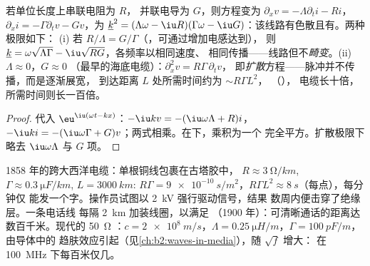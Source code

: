 \begin{proposition}\label{prop:b2:dispersion-wave-packets:lossy}
若单位长度上串联电阻为 $R$，
并联电导为 $G$，则方程变为 $\partial_xv = -\Lambda\partial_ti - Ri$，$\partial_xi =
-\Gamma\partial_tv - Gv$，为 $\underline k^2 = (\Lambda\omega -
\iu R)(\Gamma\omega - \iu G)$：该线路有色散且有。两种极限如下：
(i) 若 $R/\Lambda = G/\Gamma$（，可通过增加电感达到），
则 $\underline k = \omega\sqrt{\Lambda\Gamma} - \iu\sqrt{RG}$，各频率以相同速度、
相同传播——线路\emph{}但不\emph{畸变}。(ii) $\Lambda \approx 0$，$G \approx 0$
（最早的海底电缆）：$\partial_x^2v = R\Gamma\,\partial_tv$，
即\emph{扩散}方程——脉冲并不传播，而是逐渐展宽，
到达距离 $L$ 处所需时间约为 $\sim R\Gamma L^2$，
（），
电缆长十倍，所需时间则长一百倍。
\end{proposition}

\begin{proof}
代入 $\eu^{\iu(\omega t - kx)}$：$-\iu kv = -(\iu\omega\Lambda + R)i$，$-\iu ki = -(\iu
\omega\Gamma + G)v$；两式相乘。在下，乘积为一个
完全平方。扩散极限下略去 $\iu\omega\Lambda$ 与 $G$ 项。
\end{proof}

\begin{example}[三条电缆]\label{ex:b2:dispersion-wave-packets:cables}
1858 年的跨大西洋电缆：单根铜线包裹在古塔胶中，
$R \approx \qty{3}{\ohm/km}$, $\Gamma \approx \qty{0.3}{\micro F/km}$, $L = \qty{3000}{km}$:
$R\Gamma = \qty{9e-10}{s/m^2}$，$R\Gamma L^2 \approx \qty{8}{s}$（每点），每分钟仅
能发一个字。操作员试图以 \qty{2}{kV} 强行驱动信号，结果
数周内便击穿了绝缘层。一条电话线
每隔 \qty{2}{km} 加装线圈，以满足
（1900 年）：可清晰通话的距离达数百千米。现代的 \qty{50}{\ohm}
：$c = \qty{2e8}{m/s}$，$\Lambda = \qty{0.25}{\micro H/m}$，$\Gamma =
\qty{100}{pF/m}$，由导体中的
趋肤效应引起（见\cref{ch:b2:waves-in-media}），随 $\sqrt f$ 增大：
在 \qty{100}{MHz} 下每百米仅几。
\end{example}

